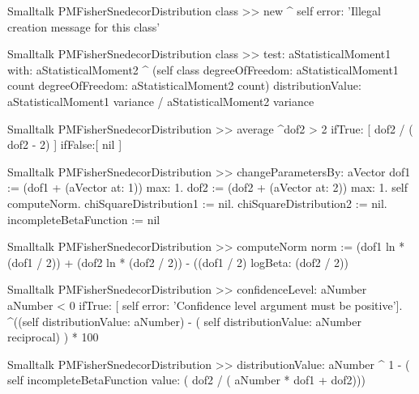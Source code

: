 \begin{displaycode}{Smalltalk}
PMFisherSnedecorDistribution class >> new
 ^ self error: 'Illegal creation message for this class'
\end{displaycode} 

\begin{displaycode}{Smalltalk}
PMFisherSnedecorDistribution class >> test: aStatisticalMoment1 with: aStatisticalMoment2
    ^ (self class degreeOfFreedom: aStatisticalMoment1 count
        degreeOfFreedom: aStatisticalMoment2 count) 
            distributionValue: aStatisticalMoment1 variance 
                    / aStatisticalMoment2 variance
\end{displaycode}

\begin{displaycode}{Smalltalk}
PMFisherSnedecorDistribution >> average
    ^dof2 > 2
        ifTrue: [ dof2 / ( dof2 - 2) ]
        ifFalse:[ nil ]
\end{displaycode}
      
\begin{displaycode}{Smalltalk}
PMFisherSnedecorDistribution >> changeParametersBy: aVector
    dof1 := (dof1 + (aVector at: 1)) max: 1.
    dof2 := (dof2 + (aVector at: 2)) max: 1.
    self computeNorm.
    chiSquareDistribution1 := nil.
    chiSquareDistribution2 := nil.
    incompleteBetaFunction := nil
\end{displaycode}
  
\begin{displaycode}{Smalltalk}
PMFisherSnedecorDistribution >> computeNorm
    norm := (dof1 ln * (dof1 / 2)) + (dof2 ln * (dof2 / 2))
                        - ((dof1 / 2) logBeta: (dof2 / 2))
\end{displaycode}

\begin{displaycode}{Smalltalk}
PMFisherSnedecorDistribution >> confidenceLevel: aNumber
    aNumber < 0
        ifTrue: [ self error: 'Confidence level argument must be 
                                                           positive'].
    ^((self distributionValue: aNumber) - ( self distributionValue: 
                                           aNumber reciprocal) ) * 100
\end{displaycode}

\begin{displaycode}{Smalltalk}
PMFisherSnedecorDistribution >> distributionValue: aNumber
    ^ 1 - ( self incompleteBetaFunction value: ( dof2 / ( aNumber * 
                                                        dof1 + dof2)))
\end{displaycode}


